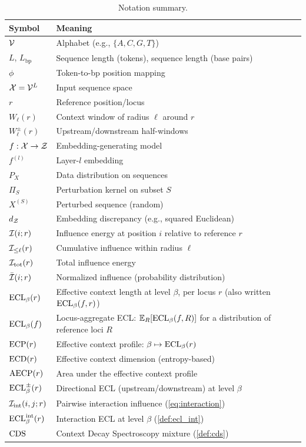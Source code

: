 \begin{table}[H]
\centering
\caption{Notation summary.}
\label{tab:notation}
\small
\begin{tabular}{@{}p{}p{}@{}}
\toprule
\textbf{Symbol} & \textbf{Meaning} \\
\midrule
$\mathcal{V}$ & Alphabet (e.g., $\{A,C,G,T\}$) \\
$L$, $L_{\mathrm{bp}}$ & Sequence length (tokens), sequence length (base pairs) \\
$\phi$ & Token-to-bp position mapping \\
$\mathcal{X}=\mathcal{V}^L$ & Input sequence space \\
$r$ & Reference position/locus \\
$W_\ell(r)$ & Context window of radius $\ell$ around $r$ \\
$W_\ell^\pm(r)$ & Upstream/downstream half-windows \\
$f:\mathcal{X}\to \mathcal{Z}$ & Embedding-generating model \\
$f^{(l)}$ & Layer-$l$ embedding \\
$P_X$ & Data distribution on sequences \\
$\Pi_S$ & Perturbation kernel on subset $S$ \\
$X^{(S)}$ & Perturbed sequence (random) \\
$d_{\mathcal{Z}}$ & Embedding discrepancy (e.g., squared Euclidean) \\
$\mathcal{I}(i;r)$ & Influence energy at position $i$ relative to reference $r$ \\
$\mathcal{I}_{\le \ell}(r)$ & Cumulative influence within radius $\ell$ \\
$\mathcal{I}_{\mathrm{tot}}(r)$ & Total influence energy \\
$\bar{\mathcal{I}}(i;r)$ & Normalized influence (probability distribution) \\
$\mathrm{ECL}_\beta(r)$ & Effective context length at level $\beta$, per locus $r$ (also written $\mathrm{ECL}_\beta(f,r)$) \\
$\mathrm{ECL}_\beta(f)$ & Locus-aggregate ECL: $\mathbb{E}_R[\mathrm{ECL}_\beta(f,R)]$ for a distribution of reference loci $R$ \\
$\mathrm{ECP}(r)$ & Effective context profile: $\beta \mapsto \mathrm{ECL}_\beta(r)$ \\
$\mathrm{ECD}(r)$ & Effective context dimension (entropy-based) \\
$\mathrm{AECP}(r)$ & Area under the effective context profile \\
$\mathrm{ECL}_\beta^\pm(r)$ & Directional ECL (upstream/downstream) at level $\beta$ \\
$\mathcal{I}_{\mathrm{int}}(i,j;r)$ & Pairwise interaction influence (\cref{eq:interaction}) \\
$\mathrm{ECL}^{\mathrm{int}}_\beta(r)$ & Interaction ECL at level $\beta$ (\cref{def:ecl_int}) \\
$\mathrm{CDS}$ & Context Decay Spectroscopy mixture (\cref{def:cds}) \\
\bottomrule
\end{tabular}
\end{table}
